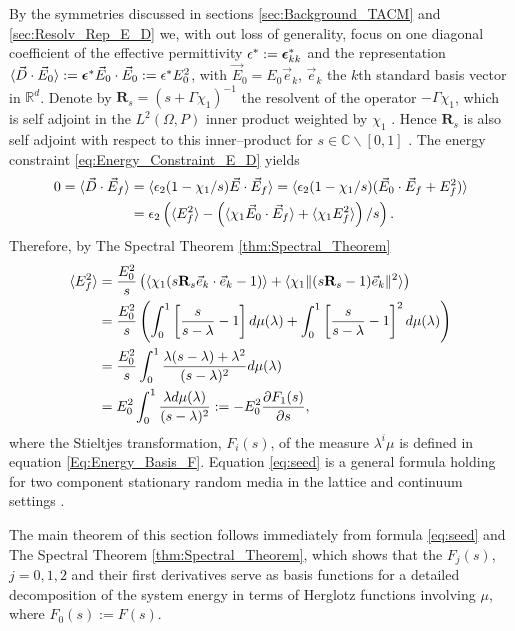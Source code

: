 \documentclass[english,12pt]{ttuthes}
\newcommand\beps{\mbox{\boldmath${\epsilon}$}}
\begin{document}
By the symmetries discussed in sections \ref{sec:Background_TACM} and
\ref{sec:Resolv_Rep_E_D} we, with out loss of generality, focus on one
diagonal coefficient of the effective permittivity
$\epsilon^*:=\beps^*_{kk}$ and the representation
$\langle\vec{D}\cdot\vec{E}_0\rangle:=\beps^*\vec{E}_0\cdot\vec{E}_0:=\epsilon^*E_0^2$, with
$\vec{E}_0=E_0\vec{e}_k$, $\vec{e}_k$ the $k$th standard basis vector
in $\mathbb{R}^d$. Denote by $\mathbf{R}_s=(s+\Gamma\chi_1)^{-1}$ the
resolvent of the operator $-\Gamma\chi_1$, 
which is self adjoint in the $L^2(\Omega,P)$ inner product weighted by
$\chi_1$ \cite{Golden:CMP-473}. Hence $\mathbf{R}_s$ is also self adjoint
with respect to this inner--product for $s\in\mathbb{C}\backslash[0,1]$
\cite{Stone:64}. The energy constraint
\eqref{eq:Energy_Constraint_E_D} yields 
% 
\begin{align}
 0=\langle\vec{D}\cdot\vec{E}_f\rangle&=\langle\epsilon_2(1-\chi_1/s)\vec{E}\cdot\vec{E}_f\rangle
 =\langle\epsilon_2(1-\chi_1/s)(\vec{E}_0\cdot\vec{E}_f+E_f^2)\rangle\\
 &=\epsilon_2\left(\langle E_f^2\rangle- \left(\langle\chi_1\vec{E}_0\cdot\vec{E}_f\rangle
     + \langle\chi_1E_f^2\rangle\right)/s\right).\notag
\end{align}
%
Therefore, by The Spectral Theorem \ref{thm:Spectral_Theorem}  
%
\begin{align}\label{eq:seed}
  \langle E_f^2\rangle&=\frac{E_0^2}{s}\left( \langle\chi_1(s\mathbf{R}_s\vec{e}_k\cdot\vec{e}_k-1)\rangle
    +\langle\chi_1\|(s\mathbf{R}_s-1)\vec{e}_k\|^2\rangle   \right) \\
    &= \frac{E_0^2}{s} \left(
      \int_0^1\left[ \frac{s}{s-\lambda}-1 \right] d\mu(\lambda)
      + \int_0^1\left[ \frac{s}{s-\lambda}-1 \right]^2 d\mu(\lambda)
      \right)\notag\\
    &=\frac{E_0^2}{s}\int_0^1 \frac{\lambda(s-\lambda)+\lambda^2}{(s-\lambda)^2} d\mu(\lambda)\notag\\
    &=E_0^2\int_0^1 \frac{\lambda d\mu(\lambda)}{(s-\lambda)^2}:=-E_0^2\frac{\partial F_1(s)}{\partial s}, \notag
\end{align}
%
where the Stieltjes transformation, $F_i(s)$, of the measure $\lambda^i\mu$ is
defined in equation \eqref{Eq:Energy_Basis_F}. Equation
\eqref{eq:seed} is a general formula holding for two component
stationary random media in the lattice and continuum settings
\cite{Golden:PRL-3935}.

The main theorem of this section follows immediately
from formula \eqref{eq:seed} and The Spectral Theorem
\ref{thm:Spectral_Theorem}, which shows that the $F_j(s)$, $j=0,1,2$ and
their first derivatives serve as basis functions for a detailed
decomposition of the system energy in terms of Herglotz functions
involving $\mu$, where $F_0(s):=F(s)$. 
\end{document}
